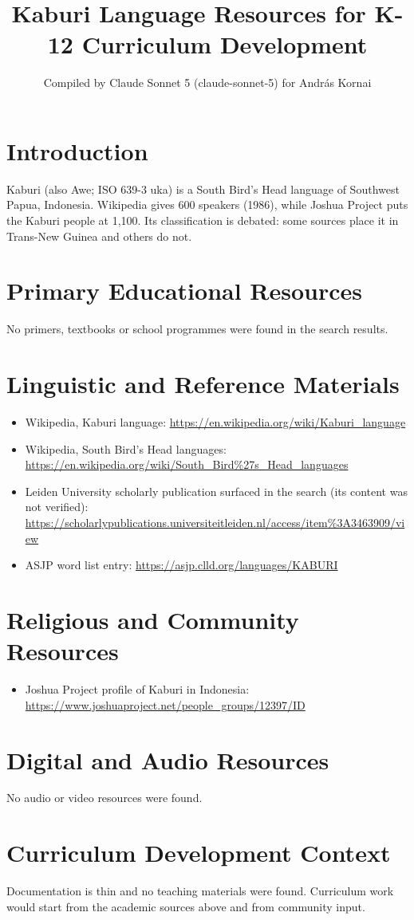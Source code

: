 \documentclass[12pt]{article}
\title{Kaburi Language Resources for K-12 Curriculum Development}
\author{Compiled by Claude Sonnet 5 (claude-sonnet-5) for Andr\'as Kornai}
\date{}
\begin{document}
\maketitle
\section{Introduction}
Kaburi (also Awe; ISO 639-3 uka) is a South Bird's Head language of Southwest Papua, Indonesia. Wikipedia gives 600 speakers (1986), while Joshua Project puts the Kaburi people at 1,100. Its classification is debated: some sources place it in Trans-New Guinea and others do not.
\section{Primary Educational Resources}
No primers, textbooks or school programmes were found in the search results.
\section{Linguistic and Reference Materials}
\begin{itemize}
\item Wikipedia, Kaburi language: \url{https://en.wikipedia.org/wiki/Kaburi_language}
\item Wikipedia, South Bird's Head languages: \url{https://en.wikipedia.org/wiki/South_Bird%27s_Head_languages}
\item Leiden University scholarly publication surfaced in the search (its content was not verified): \url{https://scholarlypublications.universiteitleiden.nl/access/item%3A3463909/view}
\item ASJP word list entry: \url{https://asjp.clld.org/languages/KABURI}
\end{itemize}
\section{Religious and Community Resources}
\begin{itemize}
\item Joshua Project profile of Kaburi in Indonesia: \url{https://www.joshuaproject.net/people_groups/12397/ID}
\end{itemize}
\section{Digital and Audio Resources}
No audio or video resources were found.
\section{Curriculum Development Context}
Documentation is thin and no teaching materials were found. Curriculum work would start from the academic sources above and from community input.
\end{document}
